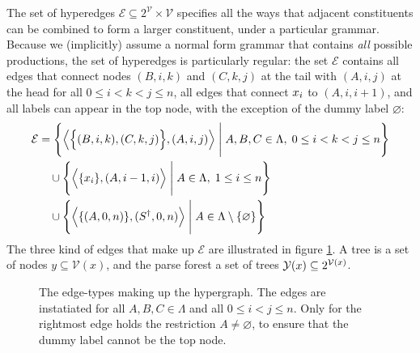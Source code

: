   The set of hyperedges $\mathcal{E} \subseteq 2^{\mathcal{V}} \times \mathcal{V}$ specifies all the ways that adjacent constituents can be combined to form a larger constituent, under a particular grammar. Because we (implicitly) assume a normal form grammar that contains \textit{all} possible productions, the set of hyperedges is particularly regular: the set $\mathcal{E}$ contains all edges that connect nodes $(B, i, k)$ and $(C, k, j)$ at the tail with $(A, i, j)$ at the head for all $0 \leq i < k < j \leq n$, all edges that connect $\x_i$ to $(A, i, i+1)$, and all labels can appear in the top node, with the exception of the dummy label $\varnothing$:
  \begin{align*}
    \mathcal{E}
      &= \Bigg\{ \Big\langle \Big\{ (B, i, k), (C, k, j) \Big\},  (A, i, j) \Big\rangle \; \Bigg\vert \; A, B, C \in \Lambda, \; 0 \leq i < k < j \leq n \Bigg\}  \\
      &\quad\cup \Bigg\{ \Big\langle \{ \x_i \}, (A, i-1, i) \Big\rangle \; \Bigg\vert \; A \in \Lambda, \; 1 \leq i \leq n \Bigg\}  \\
      &\quad\cup \Bigg\{ \Big\langle \{ (A, 0, n) \}, (S^{\dagger}, 0, n) \Big\rangle \; \Bigg\vert \; A \in \Lambda \setminus \{ \varnothing \} \Bigg\}
  \end{align*}
  The three kind of edges that make up $\mathcal{E}$ are illustrated in figure \ref{fig:crf-edges}. A tree is a set of nodes $y \subseteq \mathcal{V}(x)$, and the parse forest a set of trees $\yieldx \subseteq 2^{\mathcal{V}(x)}$.

  \begin{figure}[h]
  \label{fig:crf-edges}
    \center
    \begin{tikzpicture}[scale=.6]
      
    \end{tikzpicture}
    \caption{The edge-types making up the hypergraph. The edges are instatiated for all $A, B, C \in \Lambda$ and all $0 \leq i < j \leq n$. Only for the rightmost edge holds the restriction $A \neq \varnothing$, to ensure that the dummy label cannot be the top node.}
  \end{figure}

